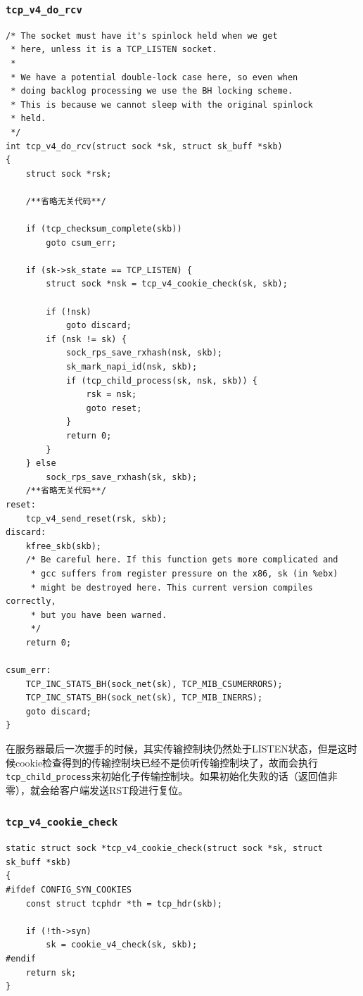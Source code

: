                 \subsubsection{\texttt{tcp_v4_do_rcv}}
\begin{verbatim}
/* The socket must have it's spinlock held when we get
 * here, unless it is a TCP_LISTEN socket.
 *
 * We have a potential double-lock case here, so even when
 * doing backlog processing we use the BH locking scheme.
 * This is because we cannot sleep with the original spinlock
 * held.
 */
int tcp_v4_do_rcv(struct sock *sk, struct sk_buff *skb)
{
    struct sock *rsk;

    /**省略无关代码**/

    if (tcp_checksum_complete(skb))
        goto csum_err;

    if (sk->sk_state == TCP_LISTEN) {
        struct sock *nsk = tcp_v4_cookie_check(sk, skb);

        if (!nsk)
            goto discard;
        if (nsk != sk) {
            sock_rps_save_rxhash(nsk, skb);
            sk_mark_napi_id(nsk, skb);
            if (tcp_child_process(sk, nsk, skb)) {
                rsk = nsk;
                goto reset;
            }
            return 0;
        }
    } else
        sock_rps_save_rxhash(sk, skb);
    /**省略无关代码**/
reset:
    tcp_v4_send_reset(rsk, skb);
discard:
    kfree_skb(skb);
    /* Be careful here. If this function gets more complicated and
     * gcc suffers from register pressure on the x86, sk (in %ebx)
     * might be destroyed here. This current version compiles correctly,
     * but you have been warned.
     */
    return 0;

csum_err:
    TCP_INC_STATS_BH(sock_net(sk), TCP_MIB_CSUMERRORS);
    TCP_INC_STATS_BH(sock_net(sk), TCP_MIB_INERRS);
    goto discard;
}
\end{verbatim}
                    在服务器最后一次握手的时候，其实传输控制块仍然处于LISTEN状态，但是这时候cookie检查得到的传输控制块已经不是侦听传输控制块了，故而会执行\texttt{tcp_child_process}来初始化子传输控制块。如果初始化失败的话（返回值非零），就会给客户端发送RST段进行复位。

                \subsubsection{\texttt{tcp_v4_cookie_check}}

\begin{verbatim}
static struct sock *tcp_v4_cookie_check(struct sock *sk, struct sk_buff *skb)
{
#ifdef CONFIG_SYN_COOKIES
    const struct tcphdr *th = tcp_hdr(skb);

    if (!th->syn)
        sk = cookie_v4_check(sk, skb);
#endif
    return sk;
}
\end{verbatim}

